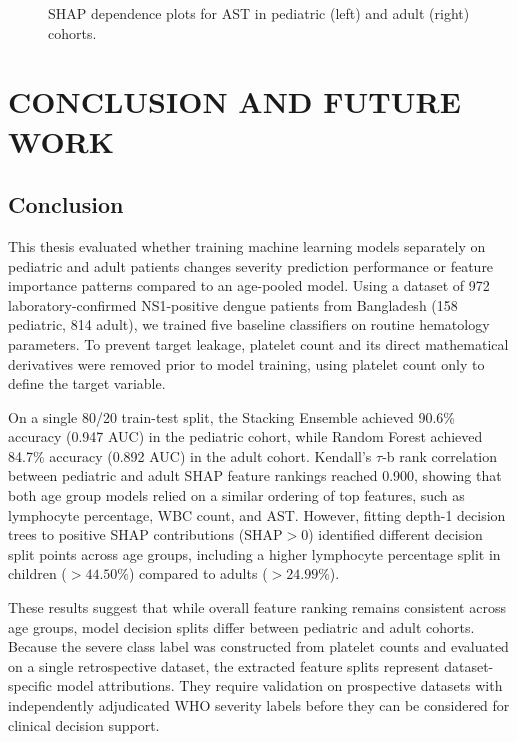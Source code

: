 \documentclass[12pt, a4paper]{report}
\begin{document}
\begin{figure}[htbp]
    \centering
    \caption{SHAP dependence plots for AST in pediatric (left) and adult (right) cohorts.}
    \label{fig:shap_ast}
\end{figure}

\chapter{CONCLUSION AND FUTURE WORK}
\section{Conclusion}
This thesis evaluated whether training machine learning models separately on pediatric and adult patients changes severity prediction performance or feature importance patterns compared to an age-pooled model. Using a dataset of 972 laboratory-confirmed NS1-positive dengue patients from Bangladesh (158 pediatric, 814 adult), we trained five baseline classifiers on routine hematology parameters. To prevent target leakage, platelet count and its direct mathematical derivatives were removed prior to model training, using platelet count only to define the target variable.

On a single 80/20 train-test split, the Stacking Ensemble achieved 90.6\% accuracy (0.947 AUC) in the pediatric cohort, while Random Forest achieved 84.7\% accuracy (0.892 AUC) in the adult cohort. Kendall's $\tau$-b rank correlation between pediatric and adult SHAP feature rankings reached 0.900, showing that both age group models relied on a similar ordering of top features, such as lymphocyte percentage, WBC count, and AST. However, fitting depth-1 decision trees to positive SHAP contributions ($\text{SHAP} > 0$) identified different decision split points across age groups, including a higher lymphocyte percentage split in children ($> 44.50\%$) compared to adults ($> 24.99\%$).

These results suggest that while overall feature ranking remains consistent across age groups, model decision splits differ between pediatric and adult cohorts. Because the severe class label was constructed from platelet counts and evaluated on a single retrospective dataset, the extracted feature splits represent dataset-specific model attributions. They require validation on prospective datasets with independently adjudicated WHO severity labels before they can be considered for clinical decision support.
\end{document}
